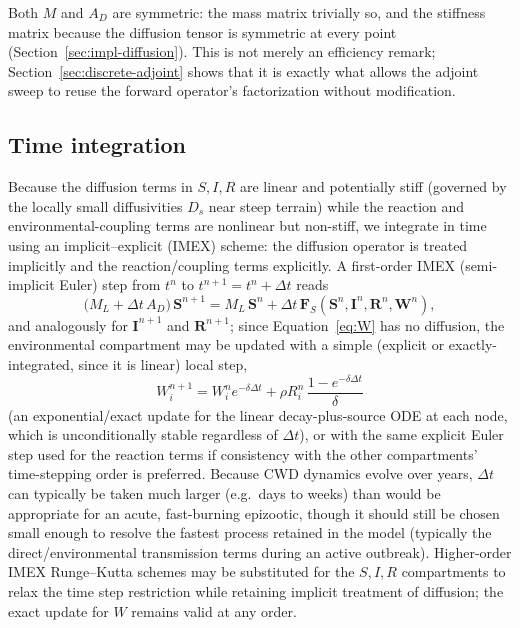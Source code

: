 \documentclass[11pt]{article}
\begin{document}
Both $M$ and $A_D$ are symmetric: the mass matrix trivially so, and the stiffness matrix because the diffusion tensor is symmetric at every point (Section~\ref{sec:impl-diffusion}). This is not merely an efficiency remark; Section~\ref{sec:discrete-adjoint} shows that it is exactly what allows the adjoint sweep to reuse the forward operator's factorization without modification.

\subsection{Time integration}

Because the diffusion terms in $S,I,R$ are linear and potentially stiff (governed by the locally small diffusivities $D_s$ near steep terrain) while the reaction and environmental-coupling terms are nonlinear but non-stiff, we integrate in time using an implicit--explicit (IMEX) scheme: the diffusion operator is treated implicitly and the reaction/coupling terms explicitly. A first-order IMEX (semi-implicit Euler) step from $t^n$ to $t^{n+1}=t^n+\Delta t$ reads
\begin{equation}
\big(M_L + \Delta t\,A_D\big)\,\mathbf{S}^{n+1} = M_L\,\mathbf{S}^n + \Delta t\,\mathbf{F}_S(\mathbf{S}^n,\mathbf{I}^n,\mathbf{R}^n,\mathbf{W}^n),
\label{eq:imex}
\end{equation}
and analogously for $\mathbf{I}^{n+1}$ and $\mathbf{R}^{n+1}$; since Equation~\eqref{eq:W} has no diffusion, the environmental compartment may be updated with a simple (explicit or exactly-integrated, since it is linear) local step,
\begin{equation}
W_i^{n+1} = W_i^n e^{-\delta \Delta t} + \rho R_i^n\,\frac{1-e^{-\delta\Delta t}}{\delta}
\end{equation}
(an exponential/exact update for the linear decay-plus-source ODE at each node, which is unconditionally stable regardless of $\Delta t$), or with the same explicit Euler step used for the reaction terms if consistency with the other compartments' time-stepping order is preferred. Because CWD dynamics evolve over years, $\Delta t$ can typically be taken much larger (e.g.\ days to weeks) than would be appropriate for an acute, fast-burning epizootic, though it should still be chosen small enough to resolve the fastest process retained in the model (typically the direct/environmental transmission terms during an active outbreak). Higher-order IMEX Runge--Kutta schemes may be substituted for the $S,I,R$ compartments to relax the time step restriction while retaining implicit treatment of diffusion; the exact update for $W$ remains valid at any order.
\end{document}
